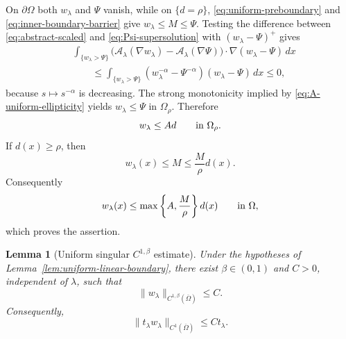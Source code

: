 \documentclass[11pt,leqno]{amsart}
\makeatletter
\newtheorem{lemma}[theorem]{Lemma}
\renewenvironment{proof}[1][\proofname]{%
  \par
  \pushQED{\qed}%
  \normalfont
  \topsep6\p@\@plus6\p@\relax
  \trivlist
  \item[\hskip\labelsep\itshape #1\@addpunct{.}]%
  \hspace{0.5em}\ignorespaces
}{%
  \popQED
  \endtrivlist\@endpefalse
}
\makeatother
\begin{document}
\begin{proof}
On $\partial\Omega$ both $w_\lambda$ and $\Psi$ vanish, while on
$\{d=\rho\}$, \eqref{eq:uniform-preboundary} and
\eqref{eq:inner-boundary-barrier} give $w_\lambda\le M\le\Psi$.
Testing the difference between \eqref{eq:abstract-scaled} and
\eqref{eq:Psi-supersolution} with $(w_\lambda-\Psi)^+$ gives
\begin{align*}
 &\int_{\{w_\lambda>\Psi\}}
 \bigl(\mathcal A_\lambda(\nabla w_\lambda)
       -\mathcal A_\lambda(\nabla\Psi)\bigr)
 \cdot\nabla(w_\lambda-\Psi)\,dx\\
 &\qquad\le
 \int_{\{w_\lambda>\Psi\}}
 (w_\lambda^{-\alpha}-\Psi^{-\alpha})
 (w_\lambda-\Psi)\,dx\le0,
\end{align*}
because $s\mapsto s^{-\alpha}$ is decreasing.  The strong
monotonicity implied by \eqref{eq:A-uniform-ellipticity} yields
$w_\lambda\le\Psi$ in $\Omega_\rho$.  Therefore
\[
 w_\lambda\le Ad\qquad\hbox{in }\Omega_\rho.
\]
If $d(x)\ge\rho$, then
\[
 w_\lambda(x)\le M\le\frac M\rho d(x).
\]
Consequently
\[
 w_\lambda(x)\le
 \max\left\{A,\frac M\rho\right\}d(x)
 \qquad\hbox{in }\Omega,
\]
which proves the assertion.
\end{proof}

\begin{lemma}[Uniform singular $C^{1,\beta}$ estimate]
\label{lem:uniform-singular-C1beta}
Under the hypotheses of
Lemma~\ref{lem:uniform-linear-boundary}, there exist
$\beta\in(0,1)$ and $C>0$, independent of $\lambda$, such that
\begin{equation}\label{eq:uniform-C1beta}
 \|w_\lambda\|_{C^{1,\beta}(\overline\Omega)}\le C.
\end{equation}
Consequently,
\begin{equation}\label{eq:u-C1-small}
 \|t_\lambda w_\lambda\|_{C^1(\overline\Omega)}
 \le Ct_\lambda.
\end{equation}
\end{lemma}
\end{document}
